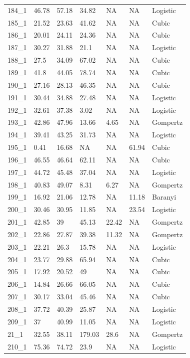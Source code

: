 \documentclass[titlepage]{article}
\begin{document}
\begin{longtable}{lllllll}
184\_1 & 46.78 & 57.18 & 34.82 & NA & NA & Logistic \\
185\_1 & 21.52 & 23.63 & 41.62 & NA & NA & Cubic \\
186\_1 & 20.01 & 24.11 & 24.36 & NA & NA & Cubic \\
187\_1 & 30.27 & 31.88 & 21.1 & NA & NA & Logistic \\
188\_1 & 27.5 & 34.09 & 67.02 & NA & NA & Cubic \\
189\_1 & 41.8 & 44.05 & 78.74 & NA & NA & Cubic \\
190\_1 & 27.16 & 28.13 & 46.35 & NA & NA & Cubic \\
191\_1 & 30.44 & 34.88 & 27.48 & NA & NA & Logistic \\
192\_1 & 32.61 & 37.38 & 3.02 & NA & NA & Logistic \\
193\_1 & 42.86 & 47.96 & 13.66 & 4.65 & NA & Gompertz \\
194\_1 & 39.41 & 43.25 & 31.73 & NA & NA & Logistic \\
195\_1 & 0.41 & 16.68 & NA & NA & 61.94 & Cubic \\
196\_1 & 46.55 & 46.64 & 62.11 & NA & NA & Cubic \\
197\_1 & 44.72 & 45.48 & 37.04 & NA & NA & Logistic \\
198\_1 & 40.83 & 49.07 & 8.31 & 6.27 & NA & Gompertz \\
199\_1 & 16.92 & 21.06 & 12.78 & NA & 11.18 & Baranyi \\
200\_1 & 30.46 & 30.95 & 11.85 & NA & 23.54 & Logistic \\
201\_1 & 42.85 & 39 & 45.13 & 22.42 & NA & Gompertz \\
202\_1 & 22.86 & 27.87 & 39.38 & 11.32 & NA & Gompertz \\
203\_1 & 22.21 & 26.3 & 15.78 & NA & NA & Logistic \\
204\_1 & 23.77 & 29.88 & 65.94 & NA & NA & Cubic \\
205\_1 & 17.92 & 20.52 & 49 & NA & NA & Cubic \\
206\_1 & 14.84 & 26.66 & 66.05 & NA & NA & Cubic \\
207\_1 & 30.17 & 33.04 & 45.46 & NA & NA & Cubic \\
208\_1 & 37.72 & 40.39 & 25.87 & NA & NA & Logistic \\
209\_1 & 37 & 40.99 & 11.05 & NA & NA & Logistic \\
21\_1 & 32.55 & 38.11 & 179.03 & 28.6 & NA & Gompertz \\
210\_1 & 75.36 & 74.72 & 23.9 & NA & NA & Logistic \\

\end{longtable}
\end{document}
